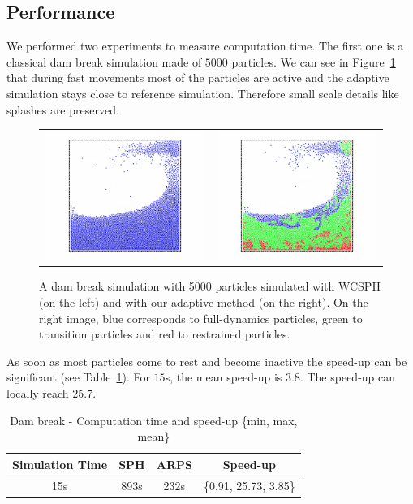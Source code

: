 \subsection{Performance}
We performed two experiments to measure computation time.
The first one is a classical dam break simulation made of $5000$ particles.
We can see in Figure~\ref{fig:ARPS_Teaser} that during fast movements most of the particles are active and the adaptive simulation stays close to reference simulation.
Therefore small scale details like splashes are preserved.

\begin{figure}[!h]
	\begin{tabular}{cc}
		\includegraphics[width=0.4\linewidth]{images/arps-vriphys2013/ReposSPHClassique1.jpg} &
		\includegraphics[width=0.4\linewidth]{images/arps-vriphys2013/ReposSPHARPSColor1.jpg}
	\end{tabular}
	\centering
	\caption[ARPS: Dam break simulations]{ A dam break simulation with 5000 particles simulated with WCSPH (on the left)
		and with our adaptive method (on the right). On the right image, blue corresponds to full-dynamics particles, green to transition particles and red to restrained particles.}
	\label{fig:ARPS_Teaser}
\end{figure}

As soon as most particles come to rest and become inactive the speed-up can be significant (see Table~\ref{table:perf1}).
For $15$s, the mean speed-up is $3.8$.
The speed-up can locally reach $25.7$.

\begin{table}[h!]
	\centering
	\begin{tabular}{|c|c|c|c|} \hline
		Simulation Time & SPH   & ARPS    & Speed-up \\ \hline
		15s     & 893s   & 232s                 &  \{0.91, 25.73, 3.85\}\\ \hline
	\end{tabular}
	\caption[ARPS: Dam break - Measurements]{\label{table:perf1}Dam break - Computation time and speed-up \small{\{min, max, mean\}}}
\end{table}

